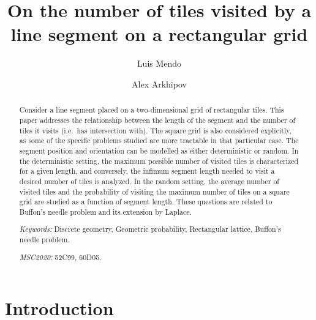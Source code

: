 \documentclass[12pt, a4paper]{article}
\begin{document}
\title{
On the number of tiles visited by a\\
line segment on a rectangular grid
}

\author[1]{Luis Mendo}
\author[2]{Alex Arkhipov}




\maketitle

\begin{abstract}
Consider a line segment placed on a two-dimensional grid of rectangular tiles. This paper addresses the relationship between the length of the segment and the number of tiles it visits (i.e.~has intersection with). The square grid is also considered explicitly, as some of the specific problems studied are more tractable in that particular case. The segment position and orientation can be modelled as either deterministic or random. In the deterministic setting, the maximum possible number of visited tiles is characterized for a given length, and conversely, the infimum segment length needed to visit a desired number of tiles is analyzed. In the random setting, the average number of visited tiles and the probability of visiting the maximum number of tiles on a square grid are studied as a function of segment length. These questions are related to Buffon's needle problem and its extension by Laplace. 

\emph{Keywords:} Discrete geometry, Geometric probability, Rectangular lattice, Buffon's needle problem.

\emph{MSC2020:} 52C99, 60D05.
\end{abstract}


\section{Introduction}
\label{part: intro}
\end{document}
